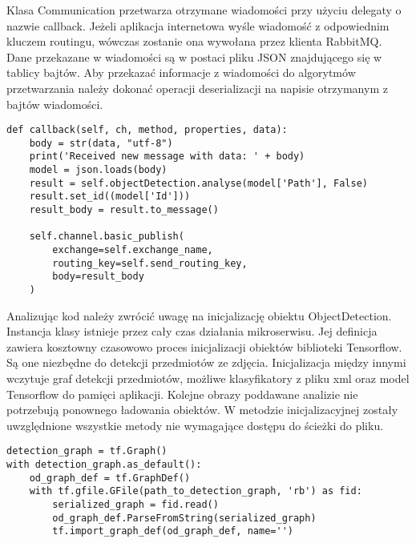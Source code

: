\begin{itemize}
Klasa Communication przetwarza otrzymane wiadomości przy użyciu delegaty o nazwie callback. Jeżeli aplikacja internetowa wyśle wiadomość z odpowiednim kluczem routingu, wówczas zostanie ona wywołana przez klienta RabbitMQ. Dane przekazane w wiadomości są w postaci pliku JSON znajdującego się w tablicy bajtów. Aby przekazać informacje z wiadomości do algorytmów przetwarzania należy dokonać operacji deserializacji na napisie otrzymanym z bajtów wiadomości.


\begin{lstlisting}[caption={Odbieranie wiadomości w środowisku Python.}]
def callback(self, ch, method, properties, data):
	body = str(data, "utf-8")
	print('Received new message with data: ' + body)
	model = json.loads(body)
	result = self.objectDetection.analyse(model['Path'], False)
	result.set_id((model['Id']))
	result_body = result.to_message()
	
	self.channel.basic_publish(
		exchange=self.exchange_name,
		routing_key=self.send_routing_key,
		body=result_body
	)
\end{lstlisting}

Analizując kod należy zwrócić uwagę na inicjalizację obiektu ObjectDetection. Instancja klasy istnieje przez cały czas działania mikroserwisu. Jej definicja zawiera kosztowny czasowowo proces inicjalizacji obiektów biblioteki Tensorflow. Są one niezbędne do detekcji przedmiotów ze zdjęcia. Inicjalizacja między innymi wczytuje graf detekcji przedmiotów, możliwe klasyfikatory z pliku xml oraz model Tensorflow do pamięci aplikacji. Kolejne obrazy poddawane analizie nie potrzebują ponownego ładowania obiektów. W metodzie inicjalizacyjnej zostały uwzględnione wszystkie metody nie wymagające dostępu do ścieżki do pliku.
\newline
\begin{lstlisting}[caption={Fragment inicjalizacji obiektów biblioteki Tensorflow.}]
detection_graph = tf.Graph()
with detection_graph.as_default():
	od_graph_def = tf.GraphDef()
	with tf.gfile.GFile(path_to_detection_graph, 'rb') as fid:
		serialized_graph = fid.read()
		od_graph_def.ParseFromString(serialized_graph)
		tf.import_graph_def(od_graph_def, name='')
	

\end{lstlisting}
\end{itemize}
